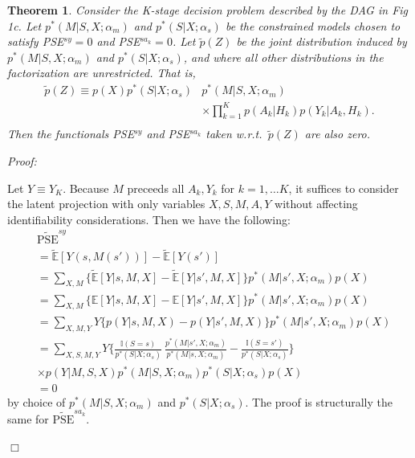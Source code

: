 \documentclass[letterpaper]{article} %
\newtheorem{thm}{Theorem}
\newcommand{\E}{\mathbb{E}}
\newenvironment{prf}{\noindent\textit{Proof:}\begin{mdseries}}{\end{mdseries}{\hfill\scriptsize$\Box$}}
\begin{document}
\begin{thm}
	Consider the K-stage decision problem described by the DAG in Fig 1c. Let $p^*(M|S,X; \alpha_{m})$ and $p^*(S|X; \alpha_s)$ be the constrained models chosen to satisfy PSE$^{sy} = 0$ and PSE$^{sa_k} = 0$. Let $\tilde{p}(Z)$ be the joint distribution induced by $p^*(M|S,X; \alpha_{m})$ and $p^*(S|X;\alpha_s)$, and where all other distributions in the factorization are unrestricted. That is,
	{\small
		\begin{align*}
		\tilde{p}(Z) \equiv p(X)p^*(S|X;\alpha_s) &p^*(M|S,X;\alpha_m)\\
		&\times \prod_{k=1}^K p(A_k|H_k) p(Y_k|A_k,H_k).\\
		\end{align*}
	}%
	Then the functionals PSE$^{sy}$ and PSE$^{sa_k}$ taken w.r.t.\ $\tilde{p}(Z)$ are also zero.
\end{thm}
\begin{prf}
Let $Y \equiv Y_K$.  Because $M$ preceeds all $A_k,Y_k$ for $k = 1, \ldots K$, it suffices to consider the latent projection
with only variables $X,S,M,A,Y$ without affecting identifiability considerations.  Then we have the following:
{\small
	\begin{align*}
	&\widetilde{\text{PSE}}^{sy} \\
	&= \tilde{\E}[Y(s,M(s'))] - \tilde{\E}[Y(s')] \\ 
	&= \sum_{X,M} \{ \tilde{\E}[Y | s,M,X] - \tilde{\E}[Y | s',M,X] \} p^*(M | s',X;{\alpha}_m) p(X) \\
	&= \sum_{X,M} \{ {\E}[Y | s,M,X] - {\E}[Y | s',M,X] \} p^*(M | s',X;{\alpha}_m) p(X) \\
	&= \sum_{X,M,Y} Y \{ p(Y | s,M,X) - p(Y | s',M,X) \} p^*(M | s',X;{\alpha}_m) p(X) \\
	&= \sum_{X,S,M,Y} Y \Big\{ \frac{\mathbb{I}(S = s)}{p^*(S | X;\alpha_s)} \ \frac{p^*(M | s', X;\alpha_m)}{p^*(M | s, X;\alpha_m)}
	- \frac{\mathbb{I}(S = s')}{p^*(S | X;\alpha_s)} \Big\}  \\
	& \times p(Y | M,S,X) p^*(M | S,X; \alpha_m) p^*(S | X; \alpha_s) p(X)\\
	&=0
	\end{align*}
}%
by choice of $p^*(M |S, X;\alpha_m)$ and $p^*(S | X;\alpha_s)$.
The proof is structurally the same for $\widetilde{\text{PSE}}^{sa_k}$.
\end{prf}
\end{document}
